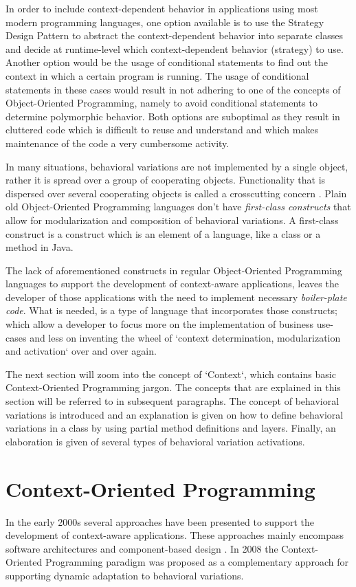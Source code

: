 \documentclass{acm_proc_article-sp}
\begin{document}
In order to include context-dependent behavior in applications using most modern programming languages, one option available is to use the Strategy Design Pattern to abstract the context-dependent behavior into separate classes and decide at runtime-level which context-dependent behavior (strategy) to use. Another option would be the usage of conditional statements to find out the context in which a certain program is running. The usage of conditional statements in these cases would result in not adhering to one of the concepts of Object-Oriented Programming, namely to avoid conditional statements to determine polymorphic behavior. Both options are suboptimal as they result in cluttered code which is difficult to reuse and understand and which makes maintenance of the code a very cumbersome activity.

In many situations, behavioral variations are not implemented by a single object, rather it is spread over a group of cooperating objects. Functionality that is dispersed over several cooperating objects is called a crosscutting concern \cite{kiczalesetallaop}. Plain old Object-Oriented Programming languages don't have \textit{first-class constructs} that allow for modularization and composition of behavioral variations. A first-class construct \cite{Keays:2003:CP:940923.940926} is a construct which is an element of a language, like a class or a method in Java. 

The lack of aforementioned constructs in regular Object-Oriented Programming languages to support the development of context-aware applications, leaves the developer of those applications with the need to implement necessary \textit{boiler-plate code}. What is needed, is a type of language that incorporates those constructs; which allow a developer to focus more on the implementation of business use-cases and less on inventing the wheel of `context determination, modularization and activation` over and over again. 

The next section will zoom into the concept of `Context`, which contains basic Context-Oriented Programming jargon. The concepts that are explained in this section will be referred to in subsequent paragraphs. The concept of behavioral variations is introduced and an explanation is given on how to define behavioral variations in a class by using partial method definitions and layers. Finally, an elaboration is given of several types of behavioral variation activations.

\section{Context-Oriented Programming}
\label{cop}
In the early 2000s several approaches have been presented to support the development of context-aware applications. These approaches mainly encompass software architectures and component-based design \cite{SALVANESCHI20121801}. In 2008 the Context-Oriented Programming paradigm was proposed \cite{HirschfeldCostanzaNierstraszCOP} as a complementary approach for supporting dynamic adaptation to behavioral variations. 
\end{document}
